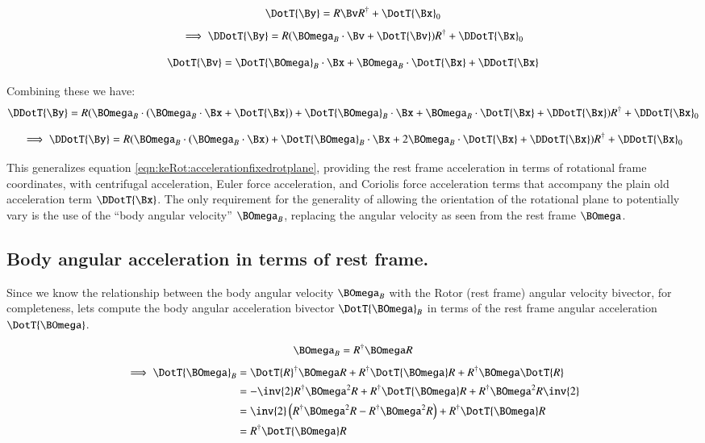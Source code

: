 \begin{equation*}
\DotT{\By} = {R \Bv R^\dagger} + \DotT{\Bx}_0
\end{equation*}
\begin{equation*}
\implies
\DDotT{\By} = {R (\BOmega_B \cdot \Bv + \DotT{\Bv} ) R^\dagger} + \DDotT{\Bx}_0
\end{equation*}

\[
\DotT{\Bv} = 
\DotT{\BOmega}_B \cdot \Bx 
+\BOmega_B \cdot \DotT{\Bx}
+ \DDotT{\Bx}
\]

Combining these we have:
\begin{align*}
\DDotT{\By} 
&= {R (\BOmega_B \cdot ( \BOmega_B \cdot \Bx + \DotT{\Bx} ) + \DotT{\BOmega}_B \cdot \Bx +\BOmega_B \cdot \DotT{\Bx} + \DDotT{\Bx}) R^\dagger} + \DDotT{\Bx}_0 \\
\end{align*}

\begin{equation}
\implies
\DDotT{\By} 
= {R (\BOmega_B \cdot ( \BOmega_B \cdot \Bx ) + \DotT{\BOmega}_B \cdot \Bx + 2\BOmega_B \cdot \DotT{\Bx} + \DDotT{\Bx}) R^\dagger} + \DDotT{\Bx}_0
\end{equation}

This generalizes equation \ref{eqn:keRot:accelerationfixedrotplane}, providing the rest frame acceleration in terms of rotational frame coordinates, with centrifugal acceleration, Euler force acceleration, and Coriolis force acceleration terms that accompany the plain old acceleration term $\DDotT{\Bx}$.  The only
requirement for the generality of allowing the orientation of the rotational plane to potentially vary is the use of the ``body angular velocity''
$\BOmega_B$, replacing the angular velocity as seen from the rest frame $\BOmega$.

\subsection{Body angular acceleration in terms of rest frame. }

Since we know the relationship between the body angular velocity $\BOmega_B$ with the Rotor (rest frame) angular velocity bivector, for
completeness, lets compute the body angular acceleration bivector $\DotT{\BOmega}_B$ in terms of the rest frame angular acceleration $\DotT{\BOmega}$.

\[
\BOmega_B = R^\dagger \BOmega R
\]
\begin{align*}
\implies
\DotT{\BOmega}_B 
&= \DotT{R}^\dagger \BOmega R +R^\dagger \DotT{\BOmega} R +R^\dagger \BOmega \DotT{R} \\
&= -\inv{2}R^\dagger \BOmega^2 R +R^\dagger \DotT{\BOmega} R +R^\dagger \BOmega^2 R \inv{2} \\
&= \inv{2} \left(R^\dagger \BOmega^2 R - R^\dagger \BOmega^2 R\right) +R^\dagger \DotT{\BOmega} R \\
&= R^\dagger \DotT{\BOmega} R \\
\end{align*}

